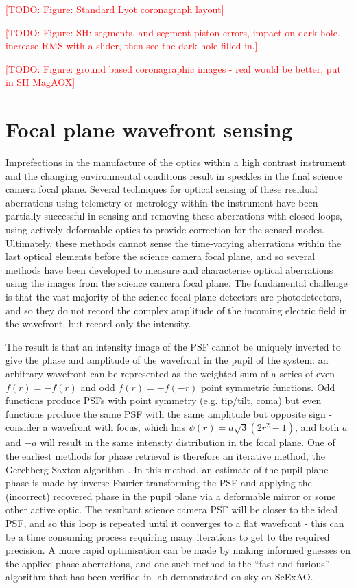 \documentclass[letterpaper]{ar-1col}
\newcommand{\todo}[1]{\textcolor{red}{[TODO: #1]}}
\begin{document}
\todo{Figure: Standard Lyot coronagraph layout}

\todo{Figure: SH: segments, and segment piston errors, impact on dark hole. increase RMS with a slider, then see the dark hole filled in.}

\todo{Figure: ground based coronagraphic images - real would be better, put in SH MagAOX}

\section{Focal plane wavefront sensing}

Imprefections in the manufacture of the optics within a high contrast instrument and the changing environmental conditions result in speckles in the final science camera focal plane.
%
Several techniques for optical sensing of these residual aberrations using telemetry or metrology within the instrument have been partially successful in sensing and removing these aberrations with closed loops, using actively deformable optics to provide correction for the sensed modes.
%
Ultimately, these methods cannot sense the time-varying aberrations within the last optical elements before the science camera focal plane, and so several methods have been developed to measure and characterise optical aberrations using the images from the science camera focal plane.
%
The fundamental challenge is that the vast majority of the science focal plane detectors are photodetectors, and so they do not record the complex amplitude of the incoming electric field in the wavefront, but record only the intensity.

The result is that an intensity image of the PSF cannot be uniquely inverted to give the phase and amplitude of the wavefront in the pupil of the system: an arbitrary wavefront can be represented as the weighted sum of a series of even $f(r)=-f(r)$ and odd $f(r)=-f(-r)$ point symmetric functions.
%
Odd functions produce PSFs with point symmetry (e.g. tip/tilt, coma) but even functions produce the same PSF with the same amplitude but opposite sign - consider a wavefront with focus, which has $\psi(r) = a\sqrt{3}(2r^2-1)$, and both $a$ and $-a$ will result in the same intensity distribution in the focal plane.
%
One of the earliest methods for phase retrieval is therefore an iterative method, the Gerchberg-Saxton algorithm \citep{Gerchberg72}.
%
In this method, an estimate of the pupil plane phase is made by inverse Fourier transforming the PSF and applying the (incorrect) recovered phase in the pupil plane via a deformable mirror or some other active optic.
%
The resultant science camera PSF will be closer to the ideal PSF, and so this loop is repeated until it converges to a flat wavefront - this can be a time consuming process requiring many iterations to get to the required precision.
%
A more rapid optimisation can be made by making informed guesses on the applied phase aberrations\citep{Gonsalves02}, and one such method is the ``fast and furious'' algorithm \citep{Keller12} that has been verified in lab \citep{Wilby18} demonstrated on-sky \citep{Bos20} on ScExAO. 
\end{document}
